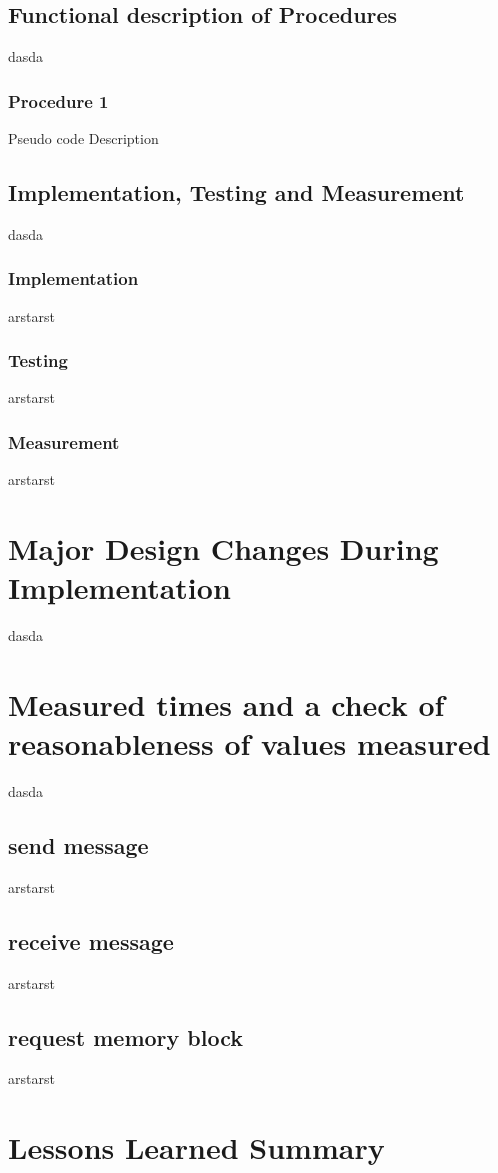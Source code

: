 \documentclass[12pt]{report}
\begin{document}
\chapter{Functional description of Procedures}
    dasda

\section{Procedure 1}
    Pseudo code
    Description

\chapter{Implementation, Testing and Measurement}
    dasda
\section{Implementation}
    arstarst

\section{Testing}
    arstarst

\section{Measurement}
    arstarst

\part{Major Design Changes During Implementation}
    dasda

\part{Measured times and a check of reasonableness of values measured}
    dasda

\chapter{send message}
    arstarst

\chapter{receive message}
    arstarst

\chapter{request memory block}
    arstarst

\part{Lessons Learned Summary}
\end{document}
